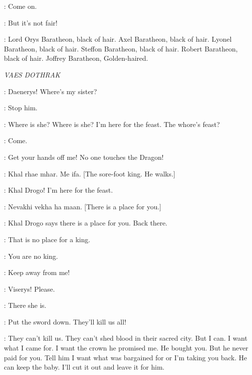 \ARYA: Come on.

\SANSA: But it's not fair! 


\NED: Lord Orys Baratheon, black of hair. Axel Baratheon, black of hair. Lyonel Baratheon, black of hair. Steffon Baratheon, black of hair. Robert Baratheon, black of hair. Joffrey Baratheon, Golden-haired. 


\scene

\textit{VAES DOTHRAK} 


\VISERYS: Daenerys! Where's my sister? 

\DAENERYS:  Stop him. 

\VISERYS: Where is she? Where is she? I'm here for the feast. The whore's feast? 


\JORAH: Come. 

\VISERYS: Get your hands off me! No one touches the Dragon! 

\QOTHO: Khal rhae mhar. Me ifa. [The sore-foot king. He walks.] 

\VISERYS: Khal Drogo! I'm here for the feast.

\DROGO: Nevakhi vekha ha maan. [There is a place for you.] 

\JORAH: Khal Drogo says there is a place for you. Back there. 

\VISERYS: That is no place for a king. 

\DROGO: You are no king. 


\VISERYS: Keep away from me! 

\DAENERYS: Viserys! Please. 

\VISERYS:  There she is. 

\JORAH: Put the sword down. They'll kill us all! 

\VISERYS: They can't kill us. They can't shed blood in their sacred city. But I can. I want what I came for. I want the crown he promised me. He bought you. But he never paid for you. Tell him I want what was bargained for or I'm taking you back. He can keep the baby. I'll cut it out and leave it for him. 

